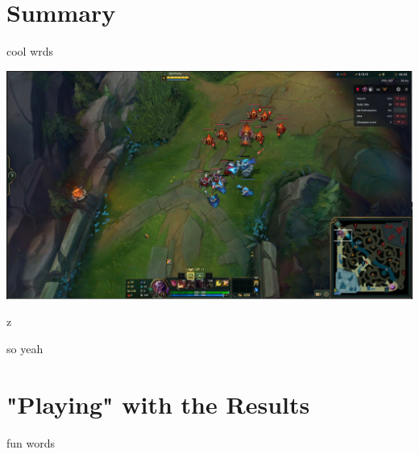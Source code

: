 \documentclass{article}
\begin{document}
\newpage
\section{Summary}

cool wrds\\
\begin{table}[h]
\includegraphics[width=\textwidth]{Crash.PNG}
\caption[A duck]{z}
so yeah

\end{table}


\newpage
\section{"Playing" with the Results}
fun words
\end{document}
